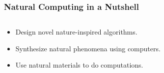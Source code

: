\documentclass[	hyperref={pdfpagelabels=false}, xcolor=dvipsnames,
		11pt]{beamer}
\begin{document}
\begin{frame}
    \frametitle{Natural Computing in a Nutshell} 

	\begin{columns}
	\begin{column}{5cm}

	\begin{overprint}

		\begin{block}{}
		  \begin{itemize}
		   \item<2-> Design novel nature-inspired algorithms.
		   \item<3-> Synthesize natural phenomena using computers.
		   \item<4-> Use natural materials to do computations.
		  \end{itemize}
		\end{block}

	\end{overprint}

	\end{column}

	\begin{column}{5cm}
	\begin{overprint}

	\testbox{
	\begin{minipage}[t]{5 cm}


\end{minipage}}
\end{overprint}
\end{column}
\end{columns}
\end{frame}
\end{document}

